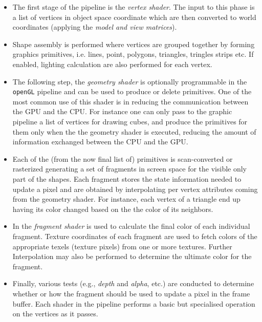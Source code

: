     \begin{itemize}
    	\item     The first stage of the pipeline is the \textit{vertex shader}. The
    	input to this phase is a list of vertices in object space coordinate which are then converted to world coordinates (applying the \textit{model and view matrices}).
    	\item  Shape assembly is performed where vertices are grouped together by forming graphics primitives, i.e. lines, point, polygons, triangles, tringles strips etc. If enabled, lighting calculation are also performed for each vertex.
    	\item   The following step, the \textit{geometry shader} is optionally programmable in the \texttt{openGL} pipeline and can be used to produce or delete primitives. One of the most common use of this shader is in reducing the communication between the GPU and the CPU. For instance one can only pass to the graphic pipeline a list of vertices for drawing cubes, and produce the primitives for them only when the the geometry shader is executed, reducing the amount of information exchanged between the CPU and the GPU.
    	\item   Each of the (from the now final list of) primitives is scan-converted or rasterized generating a set of fragments in screen space for the visible only part of the shapes. Each fragment stores the state information needed to update a pixel and are obtained by interpolating per vertex attributes coming from the geometry shader. For instance, each vertex of a triangle end up having its color changed based on the the color of its neighbors. 
    	\item  In the \textit{fragment  shader} is used to calculate the final color of each individual fragment. Texture coordinates of each fragment are used to fetch colors of the appropriate texels (texture pixels) from
    	one or more textures. Further Interpolation may also be
    	performed to determine the ultimate color for the fragment.
    	\item Finally, various tests (e.g., \textit{depth} and \textit{alpha}, etc.) are conducted to determine whether or how the fragment should be used to update a pixel in the frame buffer.    
    	Each shader in the pipeline performs a basic but specialised operation on the
    	vertices as it passes. 
    \end{itemize}

